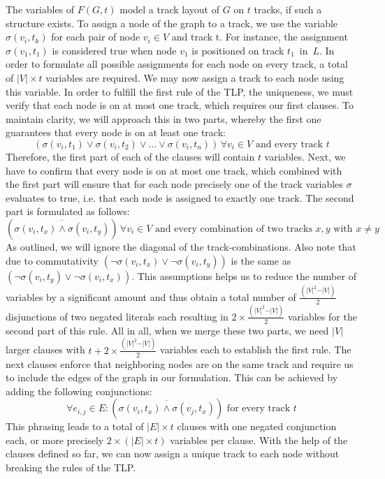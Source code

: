 \documentclass[bachelor, english]{algothesis}
\begin{document}
The variables of $F(G, t)$ model a track layout of $G$ on $t$ tracks, if such a structure exists. To assign a node of the graph to a track, we use the variable $\sigma(v_i,t_k)$ for each pair of node $v_i \in V$ and track t. For instance, the assignment $\sigma(v_1, t_1)$ is considered true when node $v_1$ is positioned on track $t_1 \,$ in $\, L$. In order to formulate all possible assignments for each node on every track, a total of $ \vert V \vert \times t$ variables are required. We may now assign a track to each node using this variable. In order to fulfill the first rule of the TLP, the uniqueness, we must verify that each node is on at most one track, which requires our first clauses. To maintain clarity, we will approach this in two parts, whereby the first one guarantees that every node is on at least one track:
    $$ (\sigma(v_i,t_1) \lor \sigma(v_i,t_2) \lor \dots \lor \sigma(v_i,t_n)) \, \forall v_i \in V \text{ and every track }t $$
Therefore, the first part of each of the clauses will contain $t$ variables. Next, we have to confirm that every node is on at most one track, which combined with the first part will ensure that for each node precisely one of the track variables $\sigma$ evaluates to true, i.e. that each node is assigned to exactly one track. The second part is formulated as follows:
    $$ (\overline{\sigma(v_i, t_x) \land \sigma(v_i, t_y)}) \, \forall v_i \in V \text{ and every combination of two tracks } x, y \text{ with } x \neq y$$
\noindent
As outlined, we will ignore the diagonal of the track-combinations. Also note that due to commutativity $(\lnot \sigma(v_i, t_x) \lor \lnot \sigma(v_i, t_y))$ is the same as $(\lnot \sigma(v_i, t_y) \lor \lnot \sigma(v_i, t_x))$. This assumptions helps us to reduce the number of variables by a significant amount and thus obtain a total number of $\frac{(\vert V \vert^2-\vert V \vert)}{2}$ disjunctions of two negated literals each resulting in $2 \times \frac{(\vert V \vert^2-\vert V \vert)}{2}$ variables for the second part of this rule. All in all, when we merge these two parts, we need $\vert V \vert$ larger clauses with $t + 2 \times \frac{(\vert V \vert^2-\vert V \vert)}{2}$ variables each to establish the first rule. The next clauses enforce that neighboring nodes are on the same track and require us to include the edges of the graph in our formulation. This can be achieved by adding the following conjunctions:
        $$ \forall e_{i,j} \in E : (\overline{\sigma(v_i,t_x) \land \sigma(v_j,t_x)}) \text{ for every track } t $$
This phrasing leads to a total of $\vert E \vert \times t$ clauses with one negated conjunction each, or more precisely $2 \times (\vert E \vert \times t)$ variables per clause. With the help of the clauses defined so far, we can now assign a unique track to each node without breaking the rules of the TLP.
\end{document}
